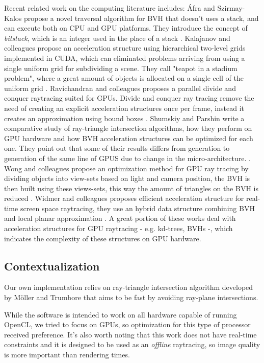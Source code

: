 \documentclass{vgtc}
\begin{document}
Recent related work on the computing literature includes: Áfra and
Szirmay-Kalos propose a novel traversal algorithm for BVH that doesn't
uses a stack, and can execute both on CPU and GPU platforms. They
introduce the concept of \emph{bitstack}, which is an integer used in
the place of a stack \cite{Afra}. Kalajanov and colleagues propose an
acceleration structure using hierarchical two-level grids implemented
in CUDA, which can eliminated problems arriving from using a single
uniform grid for subdividing a scene. They call "teapot in a stadium
problem", where a great amount of objects is allocated on a single
cell of the uniform grid \cite{Kalojanov}. Ravichandran and colleagues
proposes a parallel divide and conquer raytracing suited for
GPUs. Divide and conquer ray tracing remove the need of creating an
explicit acceleration structures once per frame, instead it creates an
approximation using bound boxes \cite{Ravichandran}. Shumskiy and
Parshin write a comparative study of ray-triangle intersection
algorithms, how they perform on GPU hardware and how BVH acceleration
structures can be optimized for each one. They point out that some of
their results differs from generation to generation of the same line
of GPUS due to change in the micro-architecture.
\cite{Shumskiy}. Wong and colleagues propose an optimization method for
GPU ray tracing by dividing objects into view-sets based on light and
camera position, the BVH is then built using these views-sets, this
way the amount of triangles on the BVH is reduced \cite{Wong}. Widmer
and colleagues proposes efficient acceleration structure for real-time
screen space raytracing, they use an hybrid data structure combining
BVH and local planar approximation \cite{Widmer}. A great portion of
these works deal with acceleration structures for GPU raytracing -
e.g. kd-trees, BVHs -, which indicates the complexity of these
structures on GPU hardware.


\subsection{Contextualization}

Our own implementation relies on ray-triangle intersection algorithm
developed by Möller and Trumbore that aims to be fast by avoiding
ray-plane intersections\cite{moller}.

While the software is intended to work on all hardware capable of
running OpenCL, we tried to focus on GPUs, so optimization for this
type of processor received preference. It's also worth noting that
this work does not have real-time constraints and it is designed to be
used as an \emph{offline} raytracing, so image quality is more
important than rendering times.
\end{document}
